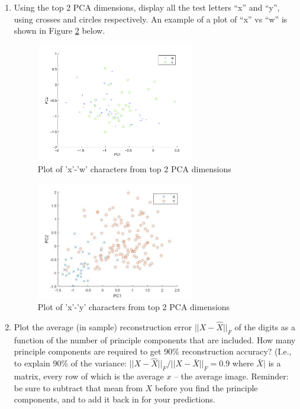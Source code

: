 \begin{enumerate}
\item {} Using the top 2 PCA dimensions, display all the test
  letters ``x'' and ``y'', using crosses and circles respectively.
  An example of a plot of ``x'' vs ``w'' is shown in Figure
  \ref{fig:pca_xw} below.

  \begin{figure}[h!]
    \centering
    \includegraphics[width=0.65\textwidth]{images/pca_x_w}
    \caption{Plot of 'x'-'w' characters from top 2 PCA
        dimensions}\label{fig:pca_xw}
  \end{figure}

 \begin{figure}[H]
    \centering
    \includegraphics[width=0.65\textwidth]{images/3_1}
    \caption{Plot of 'x'-'y' characters from top 2 PCA
        dimensions}\label{fig:pca_xw}
  \end{figure}
  
\item {} Plot the average (in sample) reconstruction error  $||X - \hat{X}||_F$
of the digits as a function of the number of principle components that are included.  How many
principle components are required to get 90\% reconstruction accuracy? (I.e., to explain 90\% of the 
variance:  $||X - \hat{X}||_F/ ||X - \bar{X}||_F = 0.9$  where $\bar{X}|$ is a matrix, every row of which is the
average $x$ -- the average image.  Reminder: be sure to subtract that mean from $X$ before you find the principle components, 
and to add it back in for your predictions. \\


\end{enumerate}
